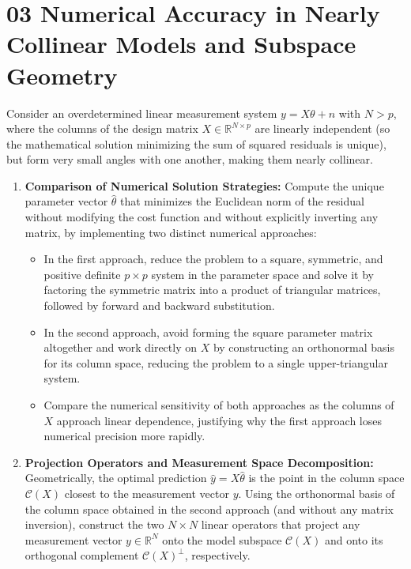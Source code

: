 \documentclass[12pt, letterpaper]{article}
\begin{document}
\vspace{1cm}

\section*{03 Numerical Accuracy in Nearly Collinear Models and Subspace Geometry}

Consider an overdetermined linear measurement system $y = X\theta + n$ with $N > p$, where the columns of the design matrix $X \in \mathbb{R}^{N \times p}$ are linearly independent (so the mathematical solution minimizing the sum of squared residuals is unique), but form very small angles with one another, making them nearly collinear.   

\begin{enumerate}
    \item \textbf{Comparison of Numerical Solution Strategies:} Compute the unique parameter vector $\hat{\theta}$ that minimizes the Euclidean norm of the residual without modifying the cost function and without explicitly inverting any matrix, by implementing two distinct numerical approaches:   
    \begin{itemize}
        \item In the first approach, reduce the problem to a square, symmetric, and positive definite $p \times p$ system in the parameter space and solve it by factoring the symmetric matrix into a product of triangular matrices, followed by forward and backward substitution.   
        \item In the second approach, avoid forming the square parameter matrix altogether and work directly on $X$ by constructing an orthonormal basis for its column space, reducing the problem to a single upper-triangular system.
        \item Compare the numerical sensitivity of both approaches as the columns of $X$ approach linear dependence, justifying why the first approach loses numerical precision more rapidly.   
    \end{itemize}
    \item \textbf{Projection Operators and Measurement Space Decomposition:} Geometrically, the optimal prediction $\hat{y} = X\hat{\theta}$ is the point in the column space $\mathcal{C}(X)$ closest to the measurement vector $y$. Using the orthonormal basis of the column space obtained in the second approach (and without any matrix inversion), construct the two $N \times N$ linear operators that project any measurement vector $y \in \mathbb{R}^N$ onto the model subspace $\mathcal{C}(X)$ and onto its orthogonal complement $\mathcal{C}(X)^\perp$, respectively.   

\end{enumerate}
\end{document}
